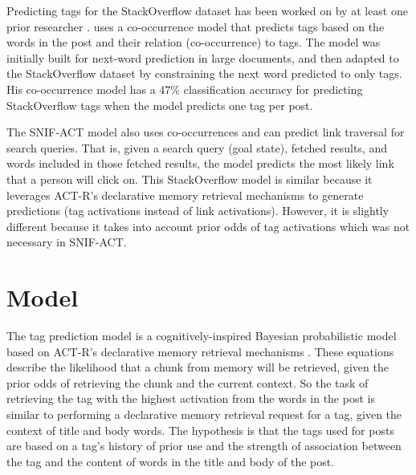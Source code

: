 \documentclass[10pt,letterpaper]{article}
\begin{document}
Predicting tags for the StackOverflow dataset has been worked on by at least one prior researcher \cite{Kuo2011}.
\citeauthor{Kuo2011} uses a co-occurrence model that predicts tags based on the words in the post and their relation (co-occurrence) to tags.
The model was initially built for next-word prediction in large documents, and then adapted to the StackOverflow dataset by constraining the next word predicted to only tags.
His co-occurrence model has a 47\% classification accuracy for predicting StackOverflow tags when the model predicts one tag per post.

The SNIF-ACT \cite{Fu2007} model also uses co-occurrences and can predict link traversal for search queries.
That is, given a search query (goal state), fetched results, and words included in those fetched results, the model predicts the most likely link that a person will click on.
This StackOverflow model is similar because it leverages ACT-R's declarative memory retrieval mechanisms to generate predictions (tag activations instead of link activations).
However, it is slightly different because it takes into account prior odds of tag activations which was not necessary in SNIF-ACT.

\section{Model}

The tag prediction model is a cognitively-inspired Bayesian probabilistic model based on ACT-R's declarative memory retrieval mechanisms \cite{Anderson2004}.
These equations describe the likelihood that a chunk from memory will be retrieved, given the prior odds of retrieving the chunk and the current context.
So the task of retrieving the tag with the highest activation from the words in the post is similar to performing a declarative memory retrieval request for a tag, given the context of title and body words.
The hypothesis is that the tags used for posts are based on a tag's history of prior use and the strength of association between the tag and the content of words in the title and body of the post.

\vspace{-1em}
\end{document}
